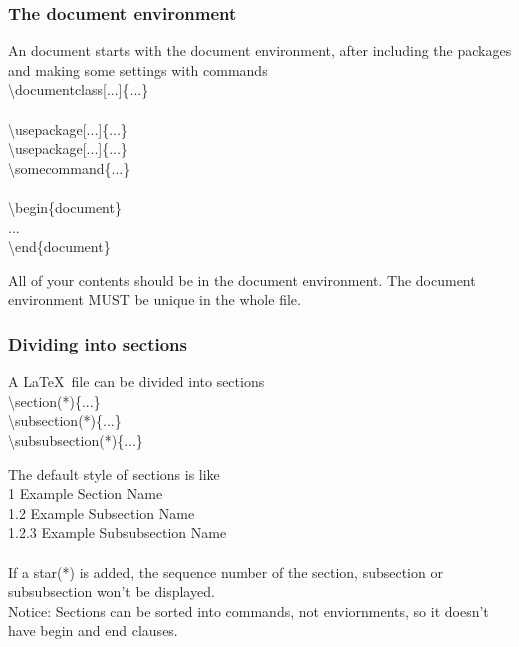 \documentclass{beamer}
\begin{document}
\begin{frame}
	\frametitle{The document environment}
	\begin{definition}
		An document starts with the {\color{blue}document} environment, after including the packages and making some settings with commands\\
		{\color{red}\textbackslash documentclass[...]\{...\}}\\
		\ \\
		{\color{red}\textbackslash usepackage[...]\{...\}}\\		
		{\color{red}\textbackslash usepackage[...]\{...\}}\\		
		{\color{red}\textbackslash somecommand\{...\}}\\
		\ \\
		{\color{red}\textbackslash begin\{document\}}\\
		\quad ...\\
		{\color{red}\textbackslash end\{document\}}\\
	\end{definition}
	All of your contents should be in the document environment. The document environment {\color{blue}MUST} be {\color{blue}unique} in the whole file.
\end{frame}

\begin{frame}
	\frametitle{Dividing into sections}
	\begin{definition}
	A \LaTeX\ file can be divided into sections\\
	{\color{red}\textbackslash section(*)\{...\}}\\
	{\color{red}\textbackslash subsection(*)\{...\}}\\
	{\color{red}\textbackslash subsubsection(*)\{...\}}\\
	\end{definition}
	The default style of sections is like\\
	{\color{blue}1 Example Section Name}\\
	{\color{blue}1.2 Example Subsection Name}\\
	{\color{blue}1.2.3 Example Subsubsection Name}\\
	\ \\
	If a star({\color{blue}*}) is added, the sequence number of the section, subsection or subsubsection won't be displayed.\\
	{\color{blue}Notice:} Sections can be sorted into commands, not enviornments, so it doesn't have {\color{blue}begin} and {\color{blue}end} clauses.
\end{frame}
\end{document}
